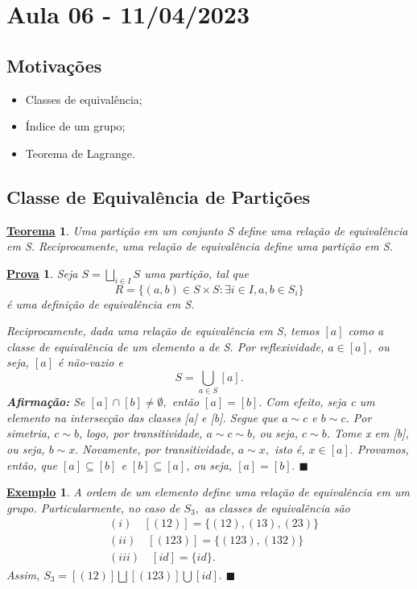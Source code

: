 \documentclass{article}
\newtheorem*{theorem*}{\underline{Teorema}}
\newtheorem{example*}{\underline{Exemplo}}
\newtheorem*{proof*}{\underline{Prova}}
\renewcommand\qedsymbol{$\blacksquare$}
\begin{document}
\section{Aula 06 - 11/04/2023}
\subsection{Motiva\c c\~oes}
\begin{itemize}
  \item Classes de equival\^encia;
  \item \'Indice de um grupo;
  \item Teorema de Lagrange.
\end{itemize}

\subsection{Classe de Equival\^encia de Parti\c c\~oes}
\begin{theorem*}
  Uma parti\c c\~ao em um conjunto S define uma rela\c c\~ao de equival\^encia em S. Reciprocamente, uma rela\c c\~ao de 
equival\^encia define uma parti\c c\~ao em S.
\end{theorem*}
\begin{proof*}
  Seja $S = \bigsqcup_{i\in I}S$ uma parti\c c\~ao, tal que
    $$
    R = \{(a,b)\in S\times S: \exists i\in I, a ,b\in S_{i}\}
    $$
  \'e uma defini\c c\~ao de equival\^encia em S.

  Reciprocamente, dada uma rela\c c\~ao de equival\^encia em S, temos $[a]$ como a classe de equival\^encia de um elemento a de S.
  Por reflexividade, $a\in[a],$ ou seja, $[a]$ \'e n\~ao-vazio e 
    $$
    S = \bigcup_{a\in S}[a].
    $$
    \textbf{Afirma\c c\~ao:} Se $[a]\cap[b]\neq\emptyset,$ ent\~ao $[a]=[b].$
    Com efeito, seja c um elemento na intersec\c c\~ao das classes [a] e [b]. Segue que $a\sim c$ e $b\sim c$. Por simetria,
    $c\sim b$, logo, por transitividade, $a\sim c\sim b$, ou seja, $c\sim b$. Tome x em [b], ou seja, $b\sim x.$ Novamente,
    por transitividade, $a\sim x,$ isto \'e, $x\in[a].$ Provamos, ent\~ao, que $[a]\subseteq{[b]}$ e $[b]\subseteq{[a]}$, ou seja,
    $[a]=[b].$ \qedsymbol
\end{proof*}
\begin{example*}
  A ordem de um elemento define uma rela\c c\~ao de equival\^encia em um grupo. Particularmente, no caso de $S_{3},$ as classes
de equival\^encia s\~ao 
 \begin{align*}
  &(i)\quad [(12)]  = \{(12), (13), (23)\}\\
  &(ii)\quad [(123)] = \{(123), (132)\}\\
  &(iii)\quad [id] = \{id\}.
 \end{align*} 
 Assim, $S_{3}=[(12)]\bigsqcup{}[(123)]\bigcup{[id]}.$ \qedsymbol
\end{example*}
\end{document}
